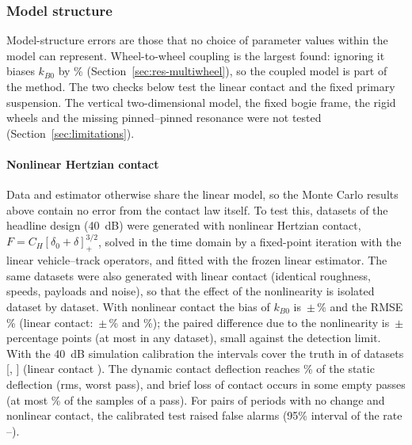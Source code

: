 
\subsubsection{Model structure}\label{sec:res-budget-struct}
Model-structure errors are those that no choice of parameter values within the model can represent.
Wheel-to-wheel coupling is the largest found: ignoring it biases $k_{B0}$ by \IgnoreCouplingForty\%
(Section~\ref{sec:res-multiwheel}), so the coupled model is part of the method. The two checks below test
the linear contact and the fixed primary suspension. The vertical two-dimensional model, the fixed bogie
frame, the rigid wheels and the missing pinned--pinned resonance were not tested
(Section~\ref{sec:limitations}).

\paragraph{Nonlinear Hertzian contact}\label{sec:res-inverse-crime}
Data and estimator otherwise share the linear model, so the Monte Carlo results above contain no error
from the contact law itself. To test this, \ICNLN{} datasets of the headline design (40~dB) were
generated with nonlinear Hertzian contact, $F = C_H[\delta_0+\delta]_+^{3/2}$, solved in the time domain by
a fixed-point iteration with the linear vehicle--track operators, and fitted with the frozen linear
estimator. The same datasets were also generated with linear contact (identical roughness, speeds,
payloads and noise), so that the effect of the nonlinearity is isolated dataset by dataset. With
nonlinear contact the bias of $k_{B0}$ is \ICNLBias\,$\pm$\,\ICNLBiasSE\% and the RMSE \ICNLRMSE\%
(linear contact: \ICLinBias\,$\pm$\,\ICLinBiasSE\% and \ICLinRMSE\%); the paired difference due to
the nonlinearity is \ICDiffMean\,$\pm$\,\ICDiffSE{} percentage points (at most \ICDiffMax{} in any
dataset), small against the detection limit. With the 40~dB simulation calibration the intervals cover
the truth in \ICNLCovCal{} of datasets [\ICNLCovCalLo, \ICNLCovCalHi] (linear contact
\ICLinCovCal). The dynamic contact deflection reaches \ICDeltaRmsMax\% of the static deflection (rms,
worst pass), and brief loss of contact occurs in some empty passes (at most \ICContactLossMax\% of the
samples of a pass). For \ICPairsN{} pairs of periods with no change and nonlinear contact, the
calibrated test raised \ICPairsFACal{} false alarms (95\% interval of the rate \ICPairsFACalLo--\ICPairsFACalHi).

